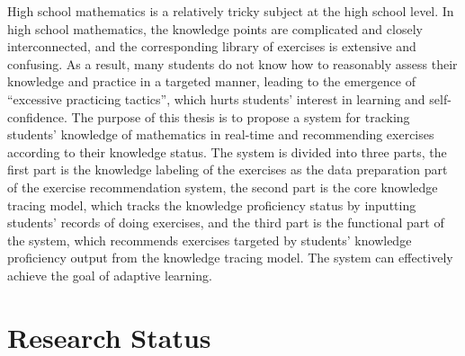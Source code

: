 
High school mathematics is a relatively tricky subject at the high school level. In high school mathematics, the knowledge points are complicated and closely interconnected, and the corresponding library of exercises is extensive and confusing. As a result, many students do not know how to reasonably assess their knowledge and practice in a targeted manner, leading to the emergence of ``excessive practicing tactics'', which hurts students' interest in learning and self-confidence. The purpose of this thesis is to propose a system for tracking students' knowledge of mathematics in real-time and recommending exercises according to their knowledge status. The system is divided into three parts, the first part is the knowledge labeling of the exercises as the data preparation part of the exercise recommendation system, the second part is the core knowledge tracing model, which tracks the knowledge proficiency status by inputting students' records of doing exercises, and the third part is the functional part of the system, which recommends exercises targeted by students' knowledge proficiency output from the knowledge tracing model. The system can effectively achieve the goal of adaptive learning.

\section{Research Status}





